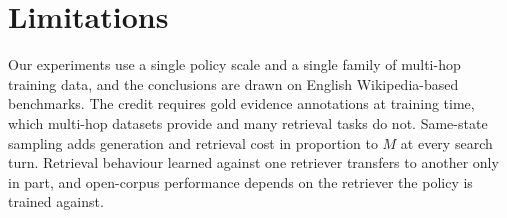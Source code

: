 \section*{Limitations}

Our experiments use a single policy scale and a single family of
multi-hop training data, and the conclusions are drawn on English
Wikipedia-based benchmarks. The credit requires gold evidence
annotations at training time, which multi-hop datasets provide and many
retrieval tasks do not. Same-state sampling adds generation and
retrieval cost in proportion to $M$ at every search turn. Retrieval
behaviour learned against one retriever transfers to another only in
part, and open-corpus performance depends on the retriever the policy
is trained against.
